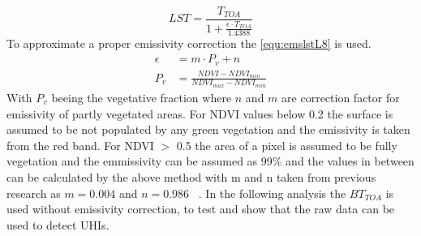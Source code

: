 \begin{equation}\label{equ:lstL8}
  LST = \frac{T_{TOA}}{1+\frac{\epsilon\cdot T_{TOA}}{1.4388}}
\end{equation}
%
To approximate a proper emissivity correction the \cref{equ:emslstL8}\cite{Sobrino2004} is used.
\begin{equation}
\begin{split}\label{equ:emslstL8}
  \epsilon &= m \cdot P_v + n \\
  P_v &= \frac{NDVI-NDVI_{min}}{NDVI_{max}- NDVI_{min}}
\end{split}
\end{equation}
With $P_v$ beeing the vegetative fraction 
where $n$ and $m$ are correction factor for emissivity of partly vegetated areas.  
%
For \ac{NDVI} values below 0.2 the surface is assumed to be not populated by any green vegetation and the emissivity is taken from the red band\cite{Nichol1994}.
For \ac{NDVI} $>$ 0.5 the area of a pixel is assumed to be fully vegetation and the emmissivity can be assumed as 99\%\cite{Sobrino2004} and the values in between can be calculated by the above method with m and n taken from previous research as $m = 0.004$ and $n = 0.986$
~\cite[equ.~12a\&b]{Sobrino2004}.
%
In the following analysis the $BT_{TOA}$ is used without emissivity correction, to test and show that the raw data can be used to detect \acp{UHI}. 

